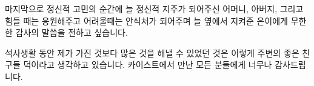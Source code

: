 \documentclass[master,english,final,pdfdoc]{kaist-ucs-improved}
\begin{document}
	마지막으로 정신적 고민의 순간에 늘 정신적 지주가 되어주신 어머니, 아버지, 그리고 힘들 때는 응원해주고 어려울때는 안식처가 되어주며 늘 옆에서 지켜준 은이에게 무한한 감사의 말씀을 전하고 싶습니다.

	
	석사생활 동안 제가 가진 것보다 많은 것을 해낼 수 있었던 것은 이렇게 주변의 좋은 친구들 덕이라고 생각하고 있습니다.
	카이스트에서 만난 모든 분들에게 너무나 감사드립니다.
\fi


\iffinal
	
\fi

  \label{paperlastpagelabel}     %
\end{document}
